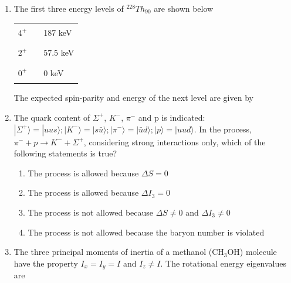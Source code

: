 \documentclass[journal,12pt,onecolumn]{IEEEtran}
\theoremstyle{remark}
\begin{document}
\begin{enumerate}
\item The first three energy levels of ${}^{228}Th_{90}$ are shown below
	\begin{center}
	\begin{tabular}{r c l}
		$4^+$ & \rule{3cm}{0.4pt} & 187 keV \\
		$2^+$ & \rule{3cm}{0.4pt} & 57.5 keV \\
		$0^+$ & \rule{3cm}{0.4pt} & 0 keV \\
	\end{tabular}
	\end{center}
The expected spin-parity and energy of the next level are given by\hfill{}

\begin{enumerate}  \end{enumerate}

\item The quark content of $\Sigma^{+}$, $K^{-}$, $\pi^{-}$ and p is indicated: $|\Sigma^{+}\rangle=|uus\rangle; |K^{-}\rangle=|s\bar{u}\rangle; |\pi^{-}\rangle=|\bar{u}d\rangle; |p\rangle=|uud\rangle$. In the process, $\pi^{-} + p \rightarrow K^{-} + \Sigma^{+}$, considering strong interactions only, which of the following statements is true?\hfill{}

\begin{enumerate}
	\item The process is allowed because $\Delta S = 0$
	\item The process is allowed because $\Delta I_3 = 0$
	\item The process is not allowed because $\Delta S \neq 0$ and $\Delta I_3 \neq 0$
	\item The process is not allowed because the baryon number is violated
\end{enumerate}

\item The three principal moments of inertia of a methanol (CH$_3$OH) molecule have the property $I_x = I_y = I$ and $I_z \neq I$. The rotational energy eigenvalues are\hfill{}

\begin{enumerate}  \end{enumerate}


\end{enumerate}
\end{document}
